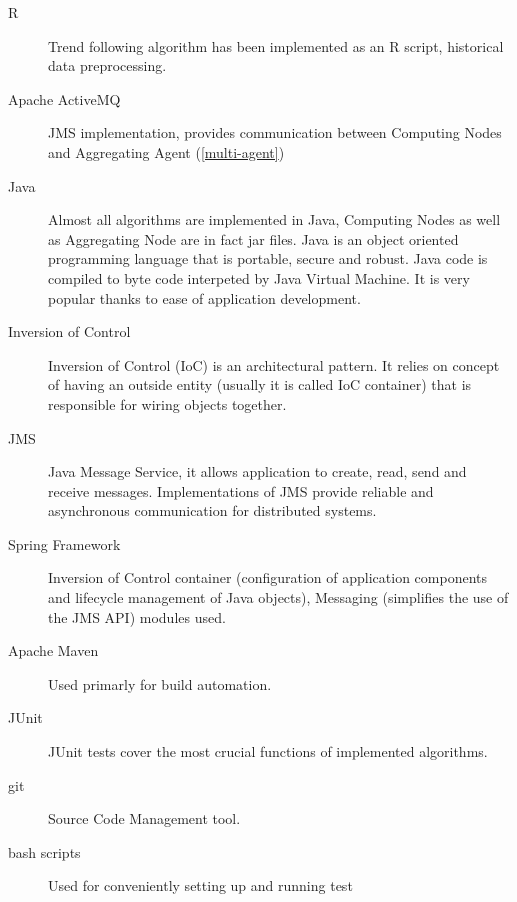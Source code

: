 \begin{description}
  \item [R]
      Trend following algorithm has been implemented as an R script, historical data preprocessing.
  \item [Apache ActiveMQ]
      JMS implementation, provides communication between Computing Nodes and Aggregating Agent (\ref{multi-agent})
  \item [Java]
      Almost all algorithms are implemented in Java, Computing Nodes as well as Aggregating Node are in fact jar files.
      Java is an object oriented programming language that is portable, secure and robust.
      Java code is compiled to byte code interpeted by Java Virtual Machine. 
      It is very popular thanks to ease of application development. 
  \item [Inversion of Control]
	Inversion of Control (IoC) is an architectural pattern.
	It relies on concept of having an outside entity (usually it is called IoC container) that is responsible for wiring objects together. \cite{Spring} 
  \item [JMS]
	Java Message Service, it allows application to create, read, send and receive messages.
	Implementations of JMS provide reliable and asynchronous communication for distributed systems. 

  \item [Spring Framework]
      Inversion of Control container (configuration of application components and lifecycle management of Java objects), Messaging (simplifies the use of the JMS API) modules used.
  \item [Apache Maven]
      Used primarly for build automation.
  \item [JUnit]
      JUnit tests cover the most crucial functions of implemented algorithms.
  \item [git]
      Source Code Management tool.
  \item [bash scripts]
      Used for conveniently setting up and running test 
\end{description}

 